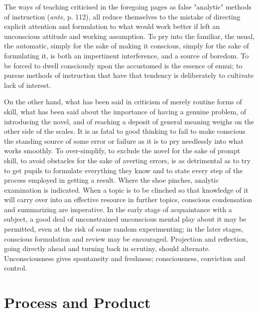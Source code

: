 \documentclass[letterpaper]{book}
\begin{document}

The ways of teaching criticised in the foregoing pages as false
"analytic" methods of instruction (\emph{ante}, p. 112), all reduce
themselves to the mistake of directing explicit attention and
formulation to what would work better if left an unconscious attitude
and working assumption. To pry into the familiar, the usual, the
automatic, simply for the sake of making it conscious, simply for the
sake of formulating it, is both an impertinent interference, and a
source of boredom. To be forced to dwell consciously upon the accustomed
is the essence of ennui; to pursue methods of instruction that have that
tendency is deliberately to cultivate lack of interest.


On the other hand, what has been said in criticism of merely routine
forms of skill, what has been said about the importance of having a
genuine problem, of introducing the novel, and of reaching a deposit of
general meaning weighs on the other side of the scales. It is as fatal
to good thinking to fail to make conscious the standing source of some
error or failure as it is to pry needlessly into what works smoothly. To
over-simplify, to exclude the novel for the sake of prompt skill, to
avoid obstacles for the sake of averting errors, is as detrimental as to
try to get pupils to formulate everything they know and to state every
step of the process employed in getting a result. Where the shoe
pinches, analytic examination is indicated. When a topic is to be
clinched so that knowledge of it will carry over into an effective
resource in further topics, conscious condensation and summarizing are
imperative. In the early stage of acquaintance with a subject, a good
deal of unconstrained unconscious mental play about it may
be
permitted, even at the risk of some random experimenting; in the later
stages, conscious formulation and review may be encouraged. Projection
and reflection, going directly ahead and turning back in scrutiny,
should alternate. Unconsciousness gives spontaneity and freshness;
consciousness, conviction and control.

\section{Process and Product}

\end{document}
